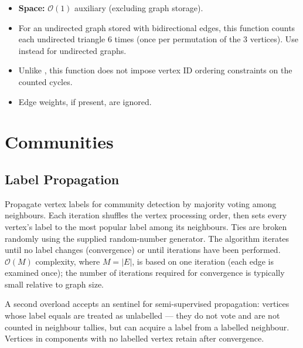 \begin{itemdescr}
\begin{itemize}
                        $\mathcal{O}(|V| \cdot d_{\max}^2)$ where $d_{\max}$ is the maximum out-degree.
                  \item \textbf{Space:} $\mathcal{O}(1)$ auxiliary (excluding graph storage).
            \end{itemize}
      \pnum\remarks 
            \begin{itemize}
                  \item For an undirected graph stored with bidirectional edges, this function
                        counts each undirected triangle 6 times (once per permutation of the 3
                        vertices). Use  instead for undirected graphs.
                  \item Unlike , this function does not impose vertex ID
                        ordering constraints on the counted cycles.
                  \item Edge weights, if present, are ignored.
            \end{itemize}
\end{itemdescr}


\section{Communities}
\subsection{Label Propagation}
Propagate vertex labels for community detection by majority voting among neighbours.
Each iteration shuffles the vertex processing order, then sets every vertex's label to the most
popular label among its neighbours. Ties are broken randomly using the supplied random-number
generator. The algorithm iterates until no label changes (convergence) or until 
iterations have been performed. $\mathcal{O}(M)$ complexity, where $M = |E|$, is based on one
iteration (each edge is examined once); the number of iterations required for convergence is
typically small relative to graph size.

A second overload accepts an  sentinel for semi-supervised propagation:
vertices whose label equals  are treated as unlabelled --- they do not vote
and are not counted in neighbour tallies, but can acquire a label from a labelled neighbour.
Vertices in components with no labelled vertex retain  after convergence.

